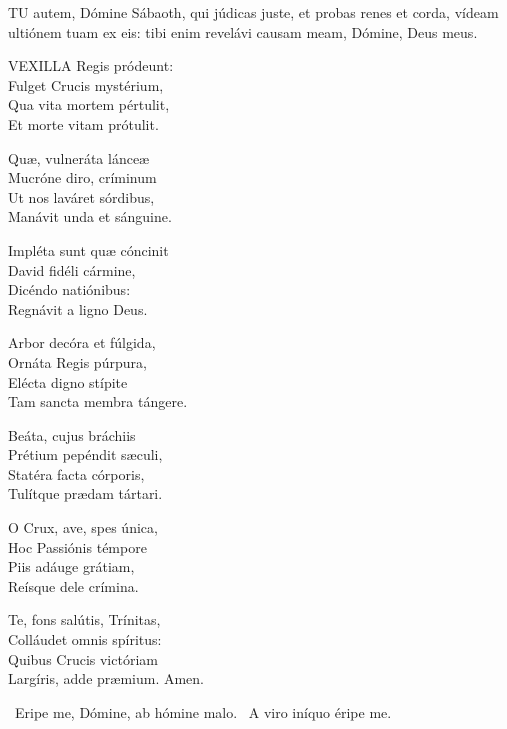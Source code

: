 \lettrine[lines=2]{T}{U} autem, Dómine Sábaoth, qui júdicas juste, et probas renes et corda, vídeam ultiónem tuam ex eis: tibi enim revelávi causam meam, Dómine, Deus meus.


\lettrine[lines=2]{V}{EXILLA} Regis pródeunt:\\
Fulget Crucis mystérium,\\
Qua vita mortem pértulit,\\
Et morte vitam prótulit.

Quæ, vulneráta lánceæ\\
Mucróne diro, críminum\\
Ut nos laváret sórdibus,\\
Manávit unda et sánguine.

Impléta sunt quæ cóncinit\\
David fidéli cármine,\\
Dicéndo natiónibus:\\
Regnávit a ligno Deus.

Arbor decóra et fúlgida,\\
Ornáta Regis púrpura,\\
Elécta digno stípite\\
Tam sancta membra tángere.

Beáta, cujus bráchiis\\
Prétium pepéndit sæculi,\\
Statéra facta córporis,\\
Tulítque prædam tártari.


O Crux, ave, spes única,\\
Hoc Passiónis témpore\\
Piis adáuge grátiam,\\
Reísque dele crímina.


Te, fons salútis, Trínitas,\\
Colláudet omnis spíritus:\\
Quibus Crucis victóriam\\
Largíris, adde præmium. Amen.

\V\ Eripe me, Dómine, ab hómine malo. \R\ A viro iníquo éripe me.




